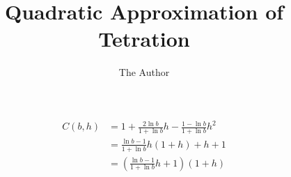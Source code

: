 \documentclass[11pt, oneside]{article}   	%
\title{Quadratic Approximation of Tetration}
\author{The Author}
\begin{document}
\maketitle
\begin{equation}
    \begin{aligned}
    C(b,h)&=1+\frac{2\ln b}{1+\ln b}h-\frac{1-\ln b}{1+\ln b}h^{2}\\
    &=\frac{\ln b-1}{1+\ln b}h(1+h)+h+1\\
    &=\left(\frac{\ln b-1}{1+\ln b}h+1\right)(1+h)\\
    \end{aligned}
\end{equation}
\end{document}
